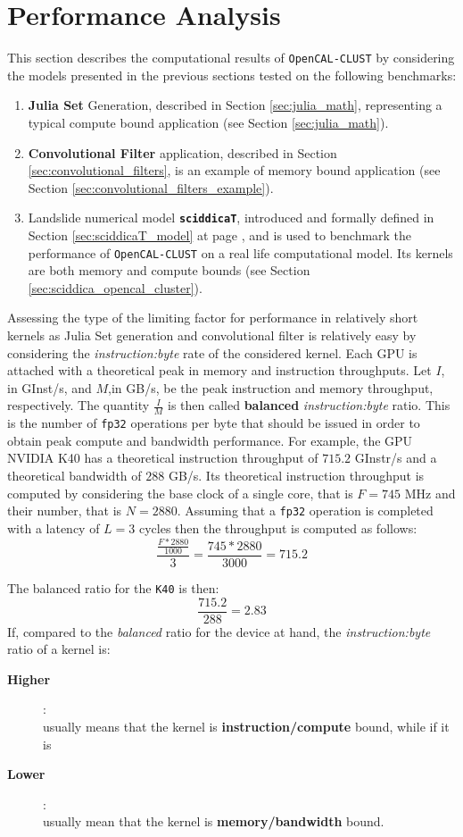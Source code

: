 \section{Performance Analysis}
\label{sec:perfomance}
This section describes the computational results of \texttt{OpenCAL-CLUST} by considering the models presented in the previous sections tested on the following benchmarks:
\begin{enumerate}
    \item \textbf{Julia Set} Generation, described in Section \ref{sec:julia_math}, representing a typical compute bound application (see Section \ref{sec:julia_math}).
    \item \textbf{Convolutional Filter} application, described in Section \ref{sec:convolutional_filters}, is an example of memory bound application (see Section \ref{sec:convolutional_filters_example}).
    \item Landslide numerical model \texttt{\textbf{sciddicaT}}, introduced and formally defined in Section \ref{sec:sciddicaT_model} at page \pageref{sec:sciddicaT_model}, and is used to benchmark the performance of \texttt{OpenCAL-CLUST} on a real life computational model. Its kernels are both memory and compute bounds (see Section \ref{sec:sciddica_opencal_cluster}).
\end{enumerate}
Assessing the type of the limiting factor for performance in relatively short kernels as Julia Set generation and convolutional filter is relatively easy by considering the \textit{instruction:byte} rate of the considered kernel.
Each GPU is attached with a theoretical peak in memory and instruction throughputs\cite{Volkov:EECS-2016-143}.
Let $I$, in \si{GInst/s}, and $M$,in \si{GB/s}, be the peak instruction and memory throughput, respectively. The quantity $\frac{I}{M}$ is then called \textbf{balanced} \textit{instruction:byte} ratio. This is the number of \texttt{fp32} operations per byte that should be issued in order to obtain peak compute and bandwidth performance.
For example, the GPU NVIDIA K40 has a theoretical instruction throughput of $715.2$ \si{GInstr/s} and a theoretical bandwidth of $288$ \si{GB/s}. 
Its theoretical instruction throughput is computed by considering the base clock of a single core, that is $F=745$ \si{MHz} and their number, that is $N=2880$. Assuming that a \texttt{fp32} operation is completed with a latency of $L=3$ cycles then the throughput is computed as follows:
\[
    \frac{\frac{F*2880}{1000}}{3} = \frac{745*2880}{3000} = 715.2
\]

The balanced ratio for the \texttt{K40} is then:\[\frac{715.2}{288} = 2.83\]
If, compared to the \textit{balanced} ratio for the device at hand, the \textit{instruction:byte} ratio of a kernel is: 
\begin{description}
    \item[\textbf{Higher}]:\\usually means that the kernel is \textbf{instruction/compute} bound, while if it is
    \item[\textbf{Lower}]:\\usually mean that the kernel is \textbf{memory/bandwidth} bound.
\end{description}


